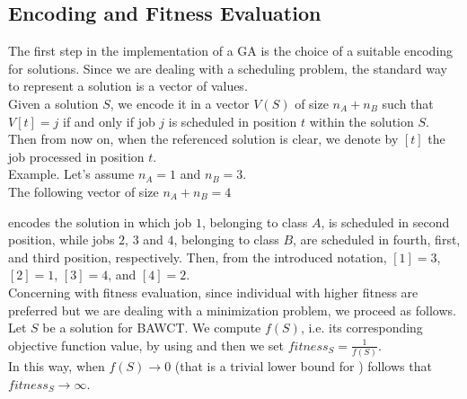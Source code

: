 \documentclass[opre,nonblindrev]{informs3} %
\begin{document}
\subsection{Encoding and Fitness Evaluation}
The first step in the implementation of a GA is the choice of a suitable encoding for solutions. Since we are dealing with a scheduling problem, the standard way to represent a solution is a vector of values.\\
Given a solution $S$, we encode it in a vector $V(S)$ of size $n_A+n_B$ such that $V[t] = j$ if and only if job $j$ is scheduled in position $t$ within the solution $S$. Then from now on, when the referenced solution is clear, we denote by $[t]$ the job processed in position $t$.\\
Example.
Let's assume $n_A = 1$ and $n_B=3$.\\
The following vector of size $n_A+n_B=4$
\begin{center}
\end{center}
 encodes the solution in which job $1$, belonging to class $A$, is scheduled in second position, while jobs $2$, $3$ and $4$, belonging to class $B$, are scheduled in fourth, first, and third position, respectively. Then, from the introduced notation, $[1]=3$, $[2]=1$, $[3]=4$, and $[4]=2$.\\
 Concerning with fitness evaluation, since individual with higher fitness are preferred but we are dealing with a minimization problem, we proceed as follows.\\Let $S$ be a solution for BAWCT. We compute $f(S)$, i.e. its corresponding objective function value, by using  and then we set $fitness_S = \frac{1}{f(S)}$.\\ In this way, when $f(S) \rightarrow 0 $ (that is a trivial lower bound for ) follows that $fitness_S \rightarrow \infty$.
\end{document}
